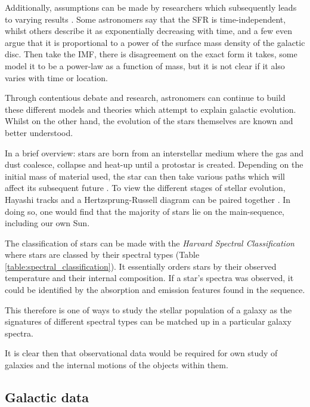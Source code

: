 \documentclass[12pt, twocolumn]{revtex4-1}    %
\begin{document}
Additionally, assumptions can be made by researchers which subsequently leads to varying results \citep{carroll_astro}. Some astronomers say that the SFR is time-independent, whilst others describe it as exponentially decreasing with time, and a few even argue that it is proportional to a power of the surface mass density of the galactic disc. Then take the IMF, there is disagreement on the exact form it takes, some model it to be a power-law as a function of mass, but it is not clear if it also varies with time or location.

Through contentious debate and research, astronomers can continue to build these different models and theories which attempt to explain galactic evolution. Whilst on the other hand, the evolution of the stars themselves are known and better understood. 

In a brief overview: stars are born from an interstellar medium where the gas and dust coalesce, collapse and heat-up until a protostar is created. Depending on the initial mass of material used, the star can then take various paths which will affect its subsequent future \citep{mccoy_space_sciences}. To view the different stages of stellar evolution, Hayashi tracks and a Hertzsprung-Russell diagram can be paired together \citep{carroll_astro}. In doing so, one would find that the majority of stars lie on the main-sequence, including our own Sun.  


The classification of stars can be made with the \textit{Harvard Spectral Classification} where stars are classed by their spectral types (Table \ref{table:spectral_classification}). It essentially orders stars by their observed temperature and their internal composition. If a star's spectra was observed, it could be identified by the absorption and emission features found in the sequence.   

This therefore is one of ways to study the stellar population of a galaxy as the signatures of different spectral types can be matched up in a particular galaxy spectra. 

It is clear then that observational data would be required for own study of galaxies and the internal motions of the objects within them. 

\subsection*{Galactic data} 
\end{document}
